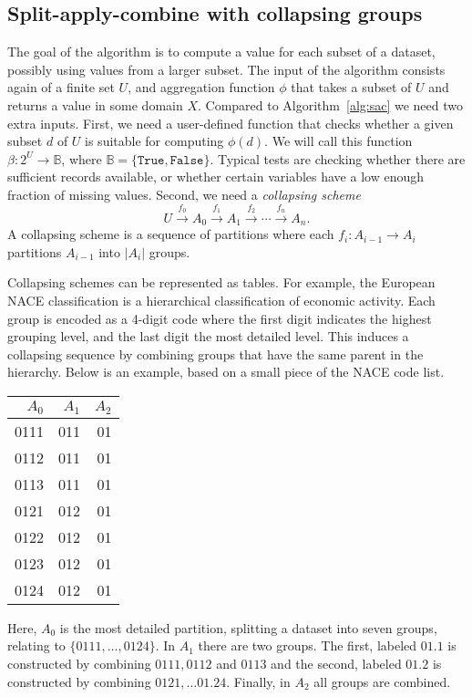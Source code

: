\documentclass[11pt, fleqn]{article}
\begin{document}
\subsection{Split-apply-combine with collapsing groups}
\label{sect:saccg}
The goal of the algorithm is to compute a value for each 
subset of a dataset, possibly using values from a larger
subset. The input of the algorithm consists again of a
finite set $U$, and aggregation function $\phi$ that takes
a subset of $U$ and returns a value in some domain $X$.
Compared to Algorithm~\ref{alg:sac} we need two extra
inputs. First, we need a user-defined function that checks whether
a given subset $d$ of $U$ is suitable for computing $\phi(d)$.
We will call this function $\beta: 2^U\to \mathbb{B}$, where
$\mathbb{B}=\{\texttt{True},\texttt{False}\}$. 
Typical tests are checking whether there are sufficient records
available, or whether certain variables have a low enough fraction
of missing values. Second, we need
a \emph{collapsing scheme}
\begin{equation}
U\xrightarrow{f_0}A_0\xrightarrow{f_1}A_1\xrightarrow{f_2}\cdots\xrightarrow{f_n}A_n.
\label{eq:collapsingsequence}
\end{equation}
A collapsing scheme is a sequence of partitions where each $f_i:A_{i-1}\to A_i$
partitions $A_{i-1}$ into $|A_i|$ groups. 

Collapsing schemes can be represented as tables. For example, the European NACE
classification is a hierarchical classification of economic activity. Each
group is encoded as a 4-digit code where the first digit indicates the highest
grouping level, and the last digit the most detailed level. This induces a
collapsing sequence by combining groups that have the same parent in the
hierarchy. Below is an example, based on a small piece of the NACE code list.
%
\begin{center}
\begin{tabular}{rrr}
\hline
 $A_0$& $A_1$ & $A_2$\\
\hline
0111&   011 & 01\\
0112&   011 & 01\\
0113&   011 & 01\\
0121&   012 & 01\\
0122&   012 & 01\\
0123&   012 & 01\\
0124&   012 & 01\\
\hline
\end{tabular}
\end{center}
Here, $A_0$ is the most detailed partition, splitting a dataset into seven
groups, relating to $\{0111,\ldots,0124\}$. In $A_1$ there are two groups.
The first, labeled $01.1$ is constructed by combining $0111, 0112$ and
$0113$ and the second, labeled $01.2$ is constructed by combining
$0121,\ldots 01.24$. Finally, in $A_2$ all groups are combined.
\end{document}
